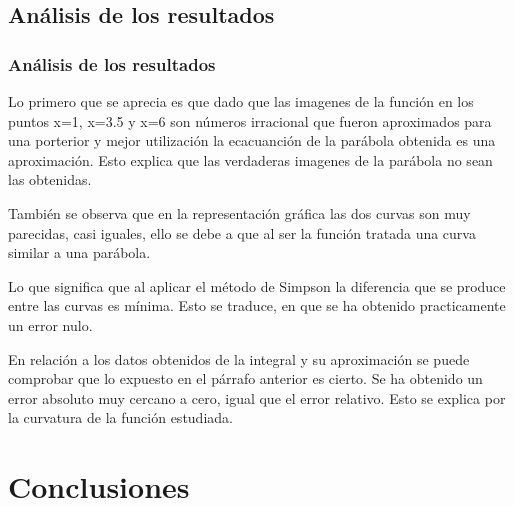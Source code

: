 \documentclass{beamer}
\begin{document}
\subsection{Análisis de los resultados}
\begin{frame}
\frametitle{Análisis de los resultados}
	Lo primero que se aprecia es que dado que las imagenes de la función en los puntos x=1, x=3.5 y x=6 
son números irracional que fueron aproximados para una porterior y mejor utilización la ecacuanción de la 
parábola obtenida es una aproximación. Esto explica que las verdaderas imagenes de la parábola no sean 
las obtenidas.

	También se observa que en la representación gráfica las dos curvas son muy parecidas, casi iguales, 
ello se debe a que al ser la función tratada una curva similar a una parábola.

	Lo que significa que al aplicar el método de Simpson la diferencia que se produce entre las curvas es 
mínima. Esto se traduce, en que se ha obtenido practicamente un error nulo.
	  
	En relación a los datos obtenidos de la integral y su aproximación se puede comprobar que 
lo expuesto en el párrafo anterior es cierto. Se ha obtenido un error absoluto muy cercano a 
cero, igual que el error relativo. Esto se explica por la curvatura de la función estudiada. 

\end{frame}


\section{Conclusiones}
\end{document}
